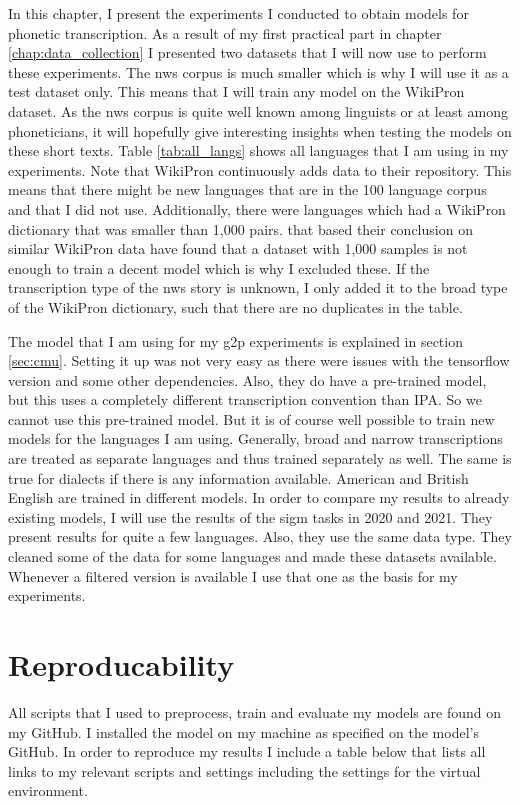 
\label{chap:exp}
In this chapter, I present the experiments I conducted to obtain models for phonetic transcription. As a result of my first practical part in chapter \ref{chap:data_collection} I presented two datasets that I will now use to perform these experiments. The \ac{nws} corpus is much smaller which is why I will use it as a test dataset only. This means that I will train any model on the WikiPron dataset. As the \ac{nws} corpus is quite well known among linguists or at least among phoneticians, it will hopefully give interesting insights when testing the models on these short texts. Table \ref{tab:all_langs} shows all languages that I am using in my experiments. Note that WikiPron continuously adds data to their repository. This means that there might be new languages that are in the 100 language corpus and that I did not use. Additionally, there were languages which had a WikiPron dictionary that was smaller than 1,000 pairs. \citet{Ashby-Bartley.2021} that based their conclusion on similar WikiPron data have found that a dataset with 1,000 samples is not enough to train a decent model which is why I excluded these. If the transcription type of the \ac{nws} story is unknown, I only added it to the broad type of the WikiPron dictionary, such that there are no duplicates in the table. 

The model that I am using for my \ac{g2p} experiments is explained in section \ref{sec:cmu}. Setting it up was not very easy as there were issues with the tensorflow version and some other dependencies. Also, they do have a pre-trained model, but this uses a completely different transcription convention than IPA. So we cannot use this pre-trained model. But it is of course well possible to train  new models for the languages I am using. Generally, broad and narrow transcriptions are treated as separate languages and thus trained separately as well. The same is true for dialects if there is any information available. American and British English are trained in different models. In order to compare my results to already existing models, I will use the results of the \ac{sigm} tasks in 2020 and 2021. They present results for quite a few languages. Also, they use the same data type. They cleaned some of the data for some languages and made these datasets available. Whenever a filtered version is available I use that one as the basis for my experiments. 

\section{Reproducability}
All scripts that I used to preprocess, train and evaluate my models are found on my GitHub. I installed the model on my machine as specified on the model's GitHub. In order to reproduce my results I include a table below that lists all links to my relevant scripts and settings including the settings for the virtual environment. 

